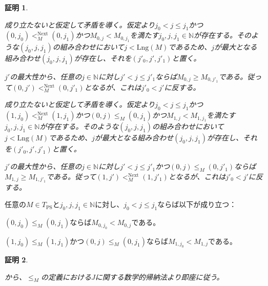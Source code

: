 \documentclass[dvipdfmx,uplatex]{jsarticle}
\theoremstyle{customnonumberbreakfortheorem}
\theoremstyle{customnonumberbreakforproof}
\newtheorem{hideableproof}{証明}
\begin{document}
\begin{hideableproof}
	\begin{penumerate}
		\item 成り立たないと仮定して矛盾を導く。仮定より\(j_0 < j \leq j_1\)かつ\((0,j_0) <_M^{\textrm{Next}} (0,j_1)\)かつ\(M_{0,j} < M_{0,j_1}\)を満たす\(j_0,j,j_1 \in \mathbb{N}\)が存在する。そのような\((j_0,j,j_1)\)の組み合わせにおいて\(j < \textrm{Lng}(M)\)であるため、\(j\)が最大となる組み合わせ\((j_0,j,j_1)\)が存在し、それを\((j'_0,j',j'_1)\)と置く。
		\item[] \(j'\)の最大性から、任意の\(j \in \mathbb{N}\)に対し\(j' < j \leq j'_1\)ならば\(M_{0,j} \geq M_{0,j'_1}\)である。従って\((0,j') <_M^{\textrm{Next}} (0,j'_1)\)となるが、これは\(j'_0 < j'\)に反する。
		\item 成り立たないと仮定して矛盾を導く。仮定より\(j_0 < j \leq j_1\)かつ\((1,j_0) <_M^{\textrm{Next}} (1,j_1)\)かつ\((0,j) \leq_M (0,j_1)\)かつ\(M_{1,j} < M_{1,j_1}\)を満たす\(j_0,j,j_1 \in \mathbb{N}\)が存在する。そのような\((j_0,j,j_1)\)の組み合わせにおいて\(j < \textrm{Lng}(M)\)であるため、\(j\)が最大となる組み合わせ\((j_0,j,j_1)\)が存在し、それを\((j'_0,j',j'_1)\)と置く。
		\item[] \(j'\)の最大性から、任意の\(j \in \mathbb{N}\)に対し\(j' < j \leq j'_1\)かつ\((0,j) \leq_M (0,j'_1)\)ならば\(M_{1,j} \geq M_{1,j'_1}\)である。従って\((1,j') <_M^{\textrm{Next}} (1,j'_1)\)となるが、これは\(j'_0 < j'\)に反する。
	\end{penumerate}
\end{hideableproof}

\begin{corollary}[直系先祖の基本性質]\label{直系先祖の基本性質}
	任意の\(M \in T_{\textrm{PS}}\)と\(j_0,j,j_1 \in \mathbb{N}\)に対し、\(j_0 < j \leq j_1\)ならば以下が成り立つ：
	\begin{penumerate}
		\item \((0,j_0) \leq_M (0,j_1)\)ならば\(M_{0,j_0} < M_{0,j}\)である。
		\item \((1,j_0) \leq_M (1,j_1)\)かつ\((0,j) \leq_M (0,j_1)\)ならば\(M_{1,j_0} < M_{1,j}\)である。
	\end{penumerate}
\end{corollary}

\begin{hideableproof}
	\begin{indented}
		\item {}から、\(\leq_M\)の定義における\(J\)に関する数学的帰納法より即座に従う。
	\end{indented}
\end{hideableproof}
\end{document}
